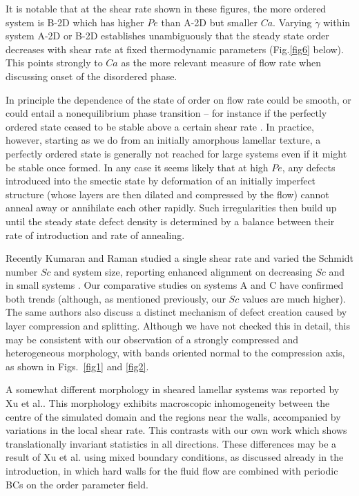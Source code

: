 \documentclass[8.5pt,twoside,twocolumn]{article}
\begin{document}
It is notable that at the shear rate shown in these figures, the more ordered system is B-2D which has higher $Pe$ than A-2D but smaller $Ca$. Varying $\dot\gamma$ within system A-2D or B-2D establishes unambiguously that the steady state order decreases with shear rate at fixed thermodynamic parameters (Fig.\ref{fig6} below). This points strongly to $Ca$ as the more relevant measure of flow rate when discussing onset of the disordered phase. 

In principle the dependence of the state of order on flow rate could be smooth, or could entail a nonequilibrium phase transition -- for instance if the perfectly ordered state ceased to be stable above a certain shear rate \cite{Gonnella98,Zilman99,Kumaran2001,Ramaswamy92}. In practice, however, starting as we do from an initially amorphous lamellar texture, a perfectly ordered state is generally not reached for large systems even if it might be stable once formed. In any case it seems likely that at high $Pe$, any defects introduced into the smectic state by deformation of an initially imperfect structure (whose layers are then dilated and compressed by the flow) cannot anneal away or annihilate each other rapidly. Such irregularities then build up until the steady state defect density is determined by a balance between their rate of introduction and rate of annealing. 

Recently Kumaran and Raman studied a single shear rate and varied the Schmidt number $Sc$ and system size, reporting enhanced alignment on decreasing $Sc$ and in small systems \cite{Kumaran2011}. Our comparative studies on systems A and C have confirmed both trends (although, as mentioned previously, our $Sc$ values are much higher). The same authors also discuss a distinct mechanism of defect creation caused by layer compression and splitting. Although we have not checked this in detail, this may be consistent with our observation of a strongly compressed and heterogeneous morphology, with bands oriented normal to the compression axis, as shown in Figs.~\ref{fig1} and \ref{fig2}.

A somewhat different morphology in sheared lamellar systems was reported by Xu et al.\cite{Xu06b}. This morphology exhibits macroscopic inhomogeneity between the centre of the simulated domain and the regions near the walls, accompanied by variations in the local shear rate. This contrasts with our own work which shows translationally invariant statistics in all directions. These differences may be a result of Xu et al.\cite{Xu06b} using mixed boundary conditions, as discussed already in the introduction, in which hard walls for the fluid flow are combined with periodic BCs on the order parameter field. 
\end{document}
